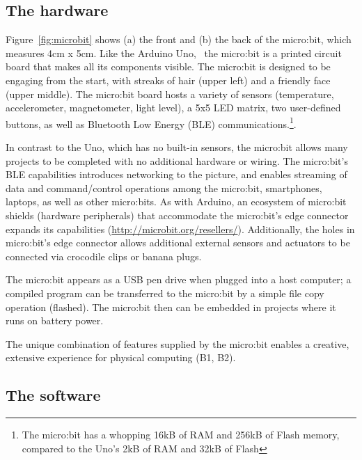 \subsection{The hardware}

Figure~\ref{fig:microbit} shows (a) the front and (b) the back of the
micro:bit, which measures 4cm x 5cm. Like the Arduino Uno,~\cite{ArduinoUno}
the micro:bit is a printed circuit board that makes all its components visible.  
The micro:bit is designed to be engaging from the start, 
with streaks of hair (upper left) and a friendly face (upper middle).
The micro:bit board hosts a variety of sensors (temperature, accelerometer, magnetometer,
light level), a 5x5 LED matrix, two user-defined buttons, as well as Bluetooth
Low Energy (BLE) communications.\footnote{The micro:bit has a whopping
16kB of RAM and 256kB of Flash memory, compared to the Uno's 2kB of
RAM and 32kB of Flash}. 

In contrast to the Uno, which has no built-in sensors, the micro:bit
allows many projects to be completed with no additional hardware or wiring.
The micro:bit's BLE capabilities introduces networking to the
picture, and enables streaming of data and command/control operations among the micro:bit,
smartphones, laptops, as well as other micro:bits.
As with Arduino, an ecosystem of micro:bit shields
(hardware peripherals) that accommodate the micro:bit's edge
connector expands its capabilities (\url{http://microbit.org/resellers/}).
Additionally, the holes in micro:bit's edge connector allows additional external sensors 
and actuators to be connected via crocodile clips or banana plugs.

The micro:bit appears as a USB pen drive when plugged into a host computer;
a compiled program can be transferred to the micro:bit by a simple file copy
operation (flashed). The micro:bit then can be embedded in projects
where it runs on battery power.

The unique combination of features supplied by the micro:bit enables a creative,
extensive experience for physical computing (B1, B2). 

\subsection{The software}

